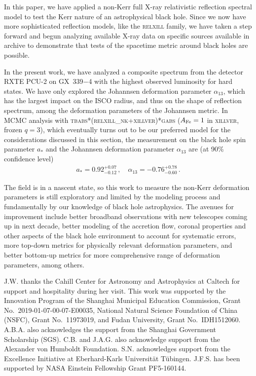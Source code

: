 \documentclass[11pt,a4paper,pdftex]{article}
\begin{document}
In this paper, we have applied a non-Kerr full X-ray relativistic reflection spectral model to test the Kerr nature of an astrophysical black hole. Since we now have more sophisticated reflection models, like the \textsc{relxill} family, we have taken a step forward and begun analyzing available X-ray data on specific sources available in archive to demonstrate that tests of the spacetime metric around black holes are possible. 

In the present work, we have analyzed a composite spectrum from the detector RXTE PCU-2 on GX~339$-$4 with the highest observed luminosity for hard states. We have only explored the Johannsen deformation parameter $\alpha_{13}$, which has the largest impact on the ISCO radius, and thus on the shape of reflection spectrum, among the deformation parameters of the Johannsen metric. In MCMC analysis with \textsc{tbabs*(relxill\_nk+xillver)*gabs} ($A_{\rm Fe}=1$ in \textsc{xillver}, frozen $q=3$), which eventually turns out to be our preferred model for the considerations discussed in this section, the measurement on the black hole spin parameter $a_*$ and the Johannsen deformation parameter $\alpha_{13}$ are (at 90\% confidence level)
\begin{align}
a_* = 0.92^{+0.07}_{-0.12} \, , \quad 
\alpha_{13} = -0.76^{+0.78}_{-0.60} \, .
\end{align}

The field is in a nascent state, so this work to measure the non-Kerr deformation parameters is still exploratory and limited by the modeling process and fundamentally by our knowledge of black hole astrophysics. The avenues for improvement include better broadband observations with new telescopes coming up in next decade, better modeling of the accretion flow, coronal properties and other aspects of the black hole environment to account for systematic errors, more top-down metrics for physically relevant deformation parameters, and better bottom-up metrics for more comprehensive range of deformation parameters, among others.






\begin{acknowledgments}
J.W. thanks the Cahill Center for Astronomy and Astrophysics at Caltech for support and hospitality during her visit. This work was supported by the Innovation Program of the Shanghai Municipal Education Commission, Grant No.~2019-01-07-00-07-E00035, National Natural Science Foundation of China (NSFC), Grant No.~11973019, and Fudan University, Grant No.~IDH1512060. A.B.A. also acknowledges the support from the Shanghai Government Scholarship (SGS). C.B. and J.A.G. also acknowledge support from the Alexander von Humboldt Foundation. S.N. acknowledges support from the Excellence Initiative at Eberhard-Karls Universit\"at T\"ubingen. J.F.S. has been supported by NASA Einstein Fellowship Grant PF5-160144.
\end{acknowledgments}
 
\end{document}
